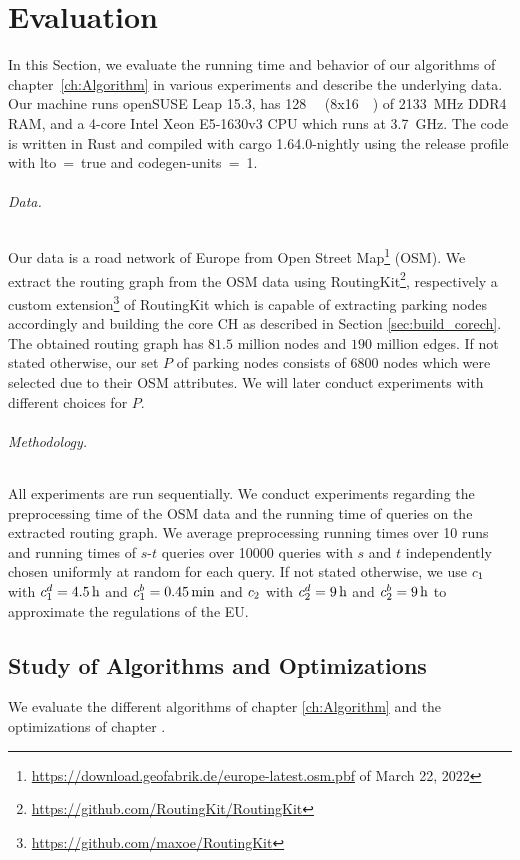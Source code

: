 
\chapter{Evaluation\label{ch:Evaluation}}
In this Section, we evaluate the running time and behavior of our algorithms of chapter~\ref{ch:Algorithm} in various experiments and describe the underlying data. Our machine runs openSUSE Leap 15.3, has \SI{128}{\giga\byte} (8x\SI{16}{\giga\byte}) of \SI{2133}{\mega\hertz} DDR4 RAM, and a 4-core Intel Xeon E5-1630v3 CPU which runs at \SI{3.7}{\giga\hertz}. The code is written in Rust and compiled with cargo 1.64.0-nightly using the release profile with lto~=~true and codegen-units~=~1.

\subparagraph{Data.} Our data is a road network of Europe from Open Street Map\footnote{\url{https://download.geofabrik.de/europe-latest.osm.pbf} of March 22, 2022} (OSM). We extract the routing graph from the OSM data using RoutingKit\footnote{\url{https://github.com/RoutingKit/RoutingKit}}, respectively a custom extension\footnote{\url{https://github.com/maxoe/RoutingKit}} of RoutingKit which is capable of extracting parking nodes accordingly and building the core CH as described in Section \ref{sec:build_corech}. The obtained routing graph has $81.5$ million nodes and $190$ million edges. If not stated otherwise, our set $P$ of parking nodes consists of 6800 nodes which were selected due to their OSM attributes. We will later conduct experiments with different choices for $P$.

\subparagraph{Methodology.} All experiments are run sequentially. We conduct experiments regarding the preprocessing time of the OSM data and the running time of queries on the extracted routing graph. We average preprocessing running times over \num{10} runs and running times of $s$-$t$ queries over \num{10000} queries with $s$ and $t$ independently chosen uniformly at random for each query. If not stated otherwise, we use $c_1$ with $c_1^d = \SI{4.5}{\hour}$ and $c_1^b = \SI{0.45}{\minute}$ and $c_2$ with $c_2^d = \SI{9}{\hour}$ and $c_2^b = \SI{9}{\hour}$ to approximate the regulations of the EU.

\section{Study of Algorithms and Optimizations}
We evaluate the different algorithms of chapter \ref{ch:Algorithm} and the optimizations of chapter .

